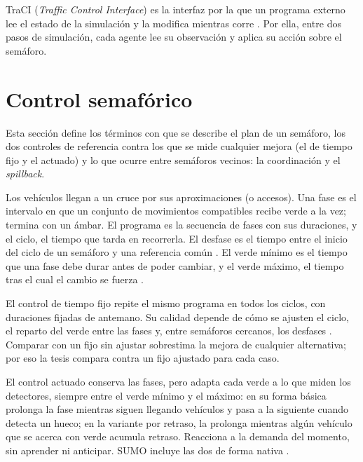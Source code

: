 TraCI (\textit{Traffic Control Interface}) es la interfaz por la que un programa externo lee el
estado de la simulación y la modifica mientras corre \citep{TraCI_Docs,TraCI_Whitepaper}. Por
ella, entre dos pasos de simulación, cada agente lee su observación y aplica su acción sobre el
semáforo.

\section{Control semafórico}
\label{sec:teoria-control}

Esta sección define los términos con que se describe el plan de un semáforo, los dos controles de
referencia contra los que se mide cualquier mejora (el de tiempo fijo y el actuado) y lo que
ocurre entre semáforos vecinos: la coordinación y el \textit{spillback}.

Los vehículos llegan a un cruce por sus aproximaciones (o accesos). Una fase es el intervalo en
que un conjunto de movimientos compatibles recibe verde a la vez; termina con un ámbar. El
programa es la secuencia de fases con sus duraciones, y el ciclo, el tiempo que tarda en
recorrerla. El desfase es el tiempo entre el inicio del ciclo de un semáforo y una referencia
común \citep{HCM2000_or_2010}. El verde mínimo es el tiempo que una
fase debe durar antes de poder cambiar, y el verde máximo, el tiempo tras el cual el cambio se
fuerza \citep{HCM2000_or_2010,SUMO_TLS_Actuated}.

El control de tiempo fijo repite el mismo programa en todos los ciclos, con duraciones fijadas de
antemano. Su calidad depende de cómo se ajusten el ciclo, el reparto del verde entre las fases y,
entre semáforos cercanos, los desfases \citep{HCM2000_or_2010}. Comparar con un fijo sin ajustar
sobrestima la mejora de cualquier alternativa; por eso la tesis compara contra un fijo ajustado
para cada caso.

El control actuado conserva las fases, pero adapta cada verde a lo que miden los detectores,
siempre entre el verde mínimo y el máximo: en su forma básica prolonga la fase mientras siguen
llegando vehículos y pasa a la siguiente cuando detecta un hueco; en la variante por retraso, la
prolonga mientras algún vehículo que se acerca con verde acumula retraso. Reacciona a la demanda
del momento, sin aprender ni anticipar. SUMO incluye las dos de forma nativa
\citep{SUMO_TLS_Actuated}.

